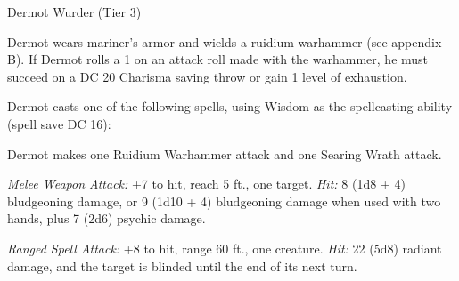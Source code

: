 \documentclass[10pt,a4paper,twoside,bg=none,twocolumn,openany,nodeprecatedcode]{dndbook}
\begin{document}
\begin{DndMonster}[float=t]{Dermot Wurder (Tier 3)}
\DndMonsterBasics[
armor-class = {20 (plate armor)},
hit-points = {\DndDice{17d6 + 34}},
speed = {30 ft., swim 30 ft. \textit{(mariner's armor)}}
]
\DndMonsterAbilityScores[
 str = 18,
 dex = 12,
 con = 14,
 int = 10,
 wis = 20,
 cha = 10
]
\DndMonsterDetails[
saving-throws = {Wis +8, Cha +3},
skills = {Medicine +8, Religion +3, Survival +8},
senses = {darkvision 60 ft., passive perception 15},
languages = {Common, Goblin, Orc},
challenge = 8,
]
Dermot wears mariner's armor and wields a ruidium warhammer (see appendix B). If Dermot rolls a 1 on an attack roll made with the warhammer, he must succeed on a DC 20 Charisma saving throw or gain 1 level of exhaustion.

Dermot casts one of the following spells, using Wisdom as the spellcasting ability (spell save DC 16):
\begin{DndMonsterSpells}
\end{DndMonsterSpells}
\par
{}
Dermot makes one Ruidium Warhammer attack and one Searing Wrath attack.

\textsl{Melee Weapon Attack:} +7 to hit, reach 5 ft., one target. \textsl{Hit:} 8 (1d8 + 4) bludgeoning damage, or 9 (1d10 + 4) bludgeoning damage when used with two hands, plus 7 (2d6) psychic damage.

\textsl{Ranged Spell Attack:} +8 to hit, range 60 ft., one creature. \textsl{Hit:} 22 (5d8) radiant damage, and the target is blinded until the end of its next turn.

\end{DndMonster}
\end{document}
